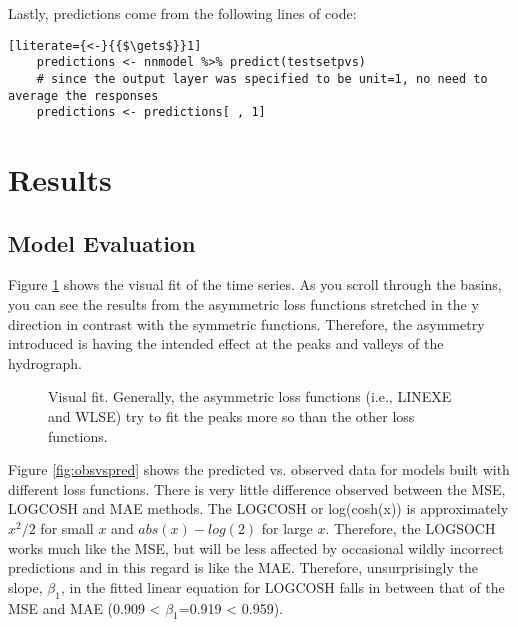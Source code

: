 Lastly, predictions come from the following lines of code: 
\begin{lstlisting}[literate={<-}{{$\gets$}}1]
	predictions <- nnmodel %>% predict(testsetpvs)
	# since the output layer was specified to be unit=1, no need to average the responses
	predictions <- predictions[ , 1] 
\end{lstlisting}

\section{Results}

\subsection{Model Evaluation}
Figure \ref{fig:visualfit} shows the visual fit of the time series. As you scroll through the basins, you can see the results from the asymmetric loss functions stretched in the y direction in contrast with the symmetric functions. Therefore, the asymmetry introduced is having the intended effect at the peaks and valleys of the hydrograph. 

\begin{figure}
	\centering
	\begin{frame}{}
	\end{frame}
	\caption[Visual fit.]{Visual fit. Generally, the asymmetric loss functions (i.e., LINEXE and WLSE) try to fit the peaks more so than the other loss functions.}
	\label{fig:visualfit}
\end{figure}

Figure \ref{fig:obsvspred} shows the predicted vs. observed data for models built with different loss functions. There is very little difference observed between the MSE, LOGCOSH and MAE methods. The LOGCOSH or log(cosh(x)) is approximately $x^ 2/2$ for small $x$ and $abs(x) - log(2)$ for large $x$. Therefore, the LOGSOCH works much like the MSE, but will be less affected by occasional wildly incorrect predictions and in this regard is like the MAE. Therefore, unsurprisingly the slope, $\beta_1$, in the fitted linear equation for LOGCOSH falls in between that of the MSE and MAE (0.909 < $\beta_1$=0.919 < 0.959). 

